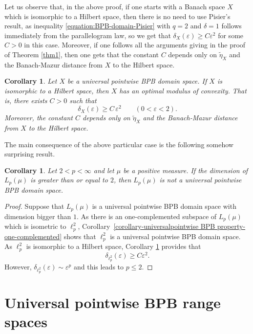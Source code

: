 \documentclass[a4paper,10pt]{amsart}
\theoremstyle{plain}
\newtheorem{corollary}[theorem]{Corollary}
\theoremstyle{definition}
\newcommand{\eps}{\varepsilon}
\renewcommand{\geq}{\geqslant}
\renewcommand{\leq}{\leqslant}
\begin{document}
Let us observe that, in the above proof, if one starts with a Banach space $X$ which is isomorphic to a Hilbert space, then there is no need to use Pisier's result, as inequality \eqref{equation:BPB-domain-Pisier} with $q=2$ and $\delta=1$ follows immediately from the parallelogram law, so we get that $\delta_X(\eps)\geq C\eps^2$ for some $C>0$ in this case. Moreover, if one follows all the arguments giving in the proof of Theorem \ref{thm1}, then one gets that the constant $C$  depends only on $\widetilde{\eta}_X$ and the Banach-Mazur distance from $X$ to the Hilbert space.

\begin{corollary}\label{cor:Hilbert-space-universal-domain}
Let $X$ be a universal pointwise BPB domain space. If $X$ is isomorphic to a Hilbert space, then $X$ has an optimal modulus of convexity. That is,  there exists $C>0$ such that
$$
\delta_X(\eps)\geq C\,\eps^2 \qquad (0<\eps<2).
$$
Moreover, the constant $C$  depends only on $\widetilde{\eta}_X$ and the Banach-Mazur distance from $X$ to the Hilbert space.
\end{corollary}

The main consequence of the above particular case is the following somehow surprising result.

\begin{corollary}\label{cor1}
Let $2<p<\infty$ and let $\mu$ be a positive measure. If the dimension of  $L_p(\mu)$ is greater than or equal to $2$, then $L_p(\mu)$ is not a universal pointwise BPB domain space.
\end{corollary}

\begin{proof}
Suppose that $L_p(\mu)$ is a universal pointwise BPB domain space with dimension bigger than $1$. As there is an one-complemented subspace of $L_p(\mu)$ which is isometric to $\ell_p^2$, Corollary~\ref{corollary-universalpointwise BPB property-one-complemented} shows that $\ell_p^2$ is a universal pointwise BPB domain space. As $\ell_p^2$ is isomorphic to a Hilbert space, Corollary \ref{cor:Hilbert-space-universal-domain} provides that
\[
\delta_{\ell_p^2}(\eps)\geq C\eps^2.
\]
However, $\delta_{\ell_p^2}(\eps) \sim  \eps^p$ and this leads to $p\leq 2$.
\end{proof}




\section{Universal pointwise BPB range spaces}\label{sec:range-spaces}
\end{document}
